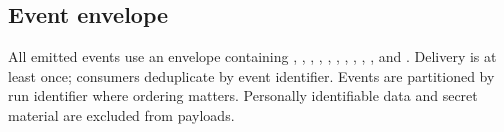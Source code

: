 \subsection{Event envelope}

All emitted events use an envelope containing , ,
, , , ,
, , , , and
. Delivery is at least once; consumers deduplicate by event identifier.
Events are partitioned by run identifier where ordering matters. Personally
identifiable data and secret material are excluded from payloads.

